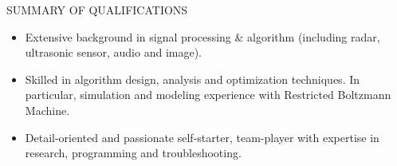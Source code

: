 \documentclass{resume} %
\begin{document}
 
\begin{rSection}{SUMMARY OF QUALIFICATIONS}  
\begin{itemize}
\item Extensive background in signal processing \& algorithm (including radar, ultrasonic sensor, audio and image).
\item Skilled in algorithm design, analysis and optimization techniques. In particular, simulation and modeling experience with Restricted Boltzmann Machine.
\item Detail-oriented and passionate self-starter, team-player with expertise in research, programming and troubleshooting.
\end{itemize}
\end{rSection}

\end{document}
